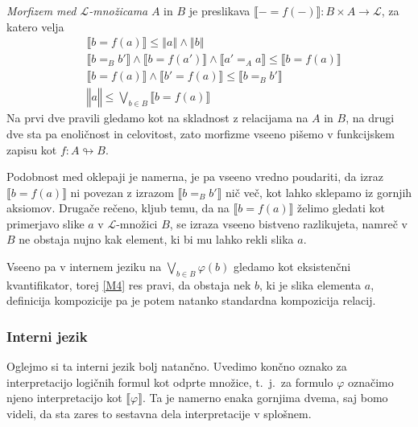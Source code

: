 \begin{definicija}
  \emph{Morfizem med \(ℒ\)-množicama} \(A\) in \(B\) je preslikava
  \(⟦- = f(-)⟧ : B×A → ℒ\), za katero velja
  \begin{align}%
    &⟦b = f(a)⟧ ≤ ‖a‖ ∧ ‖b‖                             \tag{M1}\label{M1}\\
    &⟦b =_B b'⟧ ∧ ⟦b = f(a')⟧ ∧ ⟦a' =_A a⟧ ≤ ⟦b = f(a)⟧ \tag{M2}\label{M2}\\
    &⟦b = f(a)⟧ ∧ ⟦b' = f(a)⟧ ≤ ⟦b =_B b'⟧              \tag{M3}\label{M3}\\
    &‖a‖ ≤ ⋁_{b ∈ B} ⟦b = f(a)⟧                         \tag{M4}\label{M4}
  \end{align}
  Na prvi dve pravili gledamo kot na skladnost z relacijama na \(A\) in \(B\),
  na drugi dve sta pa enoličnost in celovitost, zato morfizme vseeno pišemo v
  funkcijskem zapisu kot \(f : A ↬ B\).
\end{definicija}
\begin{opomba}
  Podobnost med oklepaji je namerna, je pa vseeno vredno poudariti, da izraz
  \(⟦b = f(a)⟧\) ni povezan z izrazom \(⟦b =_B b'⟧\) nič več, kot lahko sklepamo
  iz gornjih aksiomov. Drugače rečeno, kljub temu, da na \(⟦b = f(a)⟧\) želimo
  gledati kot primerjavo slike \(a\) v \(ℒ\)-množici \(B\), se izraza vseeno
  bistveno razlikujeta, namreč v \(B\) ne obstaja nujno kak element, ki bi mu
  lahko rekli slika \(a\).
\end{opomba}
Vseeno pa v internem jeziku na \(⋁_{b ∈ B} φ(b)\) gledamo kot eksistenčni
kvantifikator, torej \ref{M4} res pravi, da obstaja nek \(b\), ki je slika
elementa \(a\), definicija kompozicije pa je potem natanko standardna
kompozicija relacij.


\subsubsection{Interni jezik}

Oglejmo si ta interni jezik bolj natančno. Uvedimo končno oznako za
interpretacijo logičnih formul kot odprte množice, t.~j.~za formulo \(φ\)
označimo njeno interpretacijo kot \(⟦φ⟧\). Ta je namerno enaka gornjima dvema,
saj bomo videli, da sta zares to sestavna dela interpretacije v splošnem.


